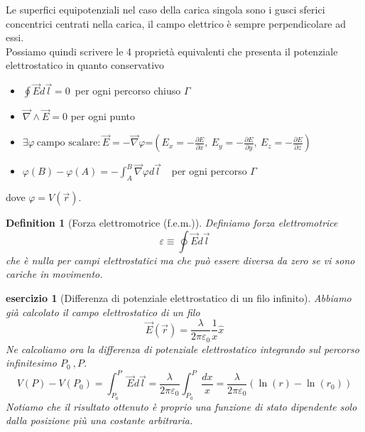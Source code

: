 \documentclass[10pt,a4paper]{article}
\newtheorem{esercizio}{esercizio}
\newtheorem{definition}{Definition}
\begin{document}
Le superfici equipotenziali nel caso della carica singola sono i gusci sferici concentrici centrati nella carica, il campo elettrico è sempre perpendicolare ad essi.\\
Possiamo quindi scrivere le 4 proprietà equivalenti che presenta il potenziale elettrostatico in quanto conservativo
\begin{itemize}
	\item \(\oint \vec{E}d\vec{l} = 0 \)\ per ogni percorso chiuso $\Gamma$ 
	\item \(\vec{\nabla}\wedge\vec{E} = 0\) per ogni punto
	\item \(\exists\varphi\  \text{campo scalare} : \vec{E}=-\vec{\nabla}\varphi\)=$\left(E_x = -\frac{\partial E}{\partial x},\ E_y= - \frac{\partial E}{\partial y},\ E_z= -\frac{\partial E}{\partial z}\right)$
	\item \(\varphi(B)-\varphi(A) = -\int_{A}^{B}\vec{\nabla}\varphi d\vec{l}\ \) \ per ogni percorso $\Gamma$ 
\end{itemize}
dove $\varphi = V(\vec{r})$.
\begin{definition}[Forza elettromotrice (f.e.m.)]
Definiamo forza elettromotrice
\[\varepsilon \equiv \oint \vec{E}d\vec{l}\]
che è nulla per campi elettrostatici ma che può essere diversa da zero se vi sono cariche in movimento.
\end{definition}
\begin{esercizio}[Differenza di potenziale elettrostatico di un filo infinito]
Abbiamo già calcolato il campo elettrostatico di un filo
\[\vec{E}(\vec{r}) = \frac{\lambda}{2\pi\varepsilon_0}\frac{1}{x}\hat{x}\]
Ne calcoliamo ora la differenza di potenziale elettrostatico integrando sul percorso infinitesimo \(P_0\ , P\). 
\[V(P)-V(P_0) = \int_{P_0}^{P}\vec{E}d\vec{l} = \frac{\lambda}{2\pi\varepsilon_0} \int_{P_0}^{P}\frac{dx}{x}= \frac{\lambda}{2\pi\varepsilon_0} \left(\ln(r)-\ln(r_0)\right)\]
Notiamo che il risultato ottenuto è proprio una funzione di stato dipendente solo dalla posizione più una costante arbitraria.  
\end{esercizio}
\end{document}
